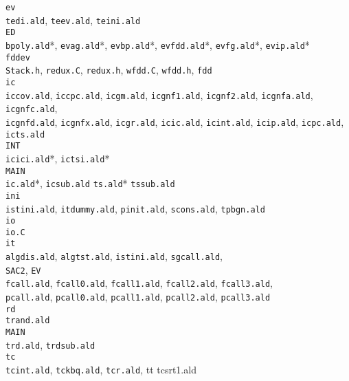 {\begin{tabbing}
 {\tt ev} \+ \\
    {\tt tedi.ald}, {\tt teev.ald}, {\tt teini.ald} \\
    {\tt ED} \+ \\
    {\tt bpoly.ald}*, {\tt evag.ald}*, {\tt evbp.ald}*, {\tt evfdd.ald}*,
    {\tt evfg.ald}*, {\tt evip.ald}* \\
    {\tt fddev} \+ \\
         {\tt Stack.h}, {\tt redux.C}, {\tt redux.h}, 
         {\tt wfdd.C}, {\tt wfdd.h}, {\tt fdd} \- \- \- \\
 {\tt ic} \+ \\
    {\tt iccov.ald}, {\tt iccpc.ald}, {\tt icgm.ald},  {\tt icgnf1.ald}, 
    {\tt icgnf2.ald}, {\tt icgnfa.ald}, {\tt icgnfc.ald}, \\
    {\tt icgnfd.ald}, {\tt icgnfx.ald}, {\tt icgr.ald}, {\tt icic.ald}, 
    {\tt icint.ald}, {\tt icip.ald}, {\tt icpc.ald}, {\tt icts.ald}  \\
    {\tt INT} \+ \\
       {\tt icici.ald}*,  {\tt ictsi.ald}* \- \\
    {\tt MAIN} \+ \\
       {\tt ic.ald}*, {\tt icsub.ald}
       {\tt ts.ald}* {\tt tssub.ald} \- \- \\
 {\tt ini} \+ \\
    {\tt istini.ald}, {\tt itdummy.ald}, {\tt pinit.ald}, {\tt scons.ald},
    {\tt tpbgn.ald}  \- \\
  {\tt io} \+ \\
      {\tt io.C} \- \\
  {\tt it} \+ \\
    {\tt algdis.ald}, {\tt algtst.ald}, {\tt istini.ald}, {\tt sgcall.ald}, \\
    {\tt SAC2}, {\tt EV} \+ \\
         {\tt fcall.ald}, {\tt fcall0.ald}, {\tt fcall1.ald}, 
         {\tt fcall2.ald}, {\tt fcall3.ald}, \\
         {\tt pcall.ald}, {\tt pcall0.ald}, {\tt pcall1.ald}, 
         {\tt pcall2.ald}, {\tt pcall3.ald} \- \- \\
  {\tt rd} \+ \\
      {\tt trand.ald} \\
      {\tt MAIN} \+ \\
           {\tt trd.ald}, {\tt trdsub.ald} \- \- \\
  {\tt tc} \+ \\
       {\tt tcint.ald}, {\tt tckbq.ald}, {\tt tcr.ald}, {tt tcsrt1.ald} \\

\end{tabbing}}
